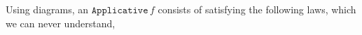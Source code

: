 \documentclass{article}
\begin{document}
Using diagrams, an $\texttt{Applicative}\,f$ consists of
satisfying the following laws, which we can never understand,
\end{document}
